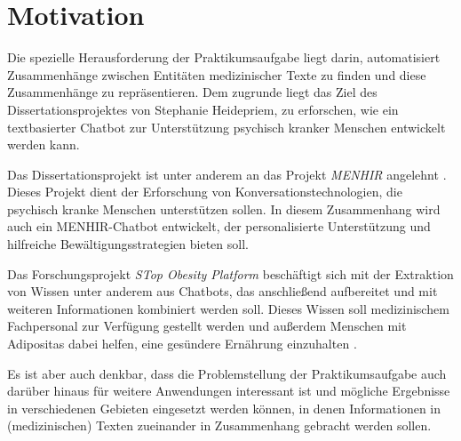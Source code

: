 \section{Motivation}

Die spezielle Herausforderung der Praktikumsaufgabe liegt darin, automatisiert Zusammenhänge zwischen Entitäten medizinischer Texte zu finden und diese Zusammenhänge zu repräsentieren. Dem zugrunde liegt das Ziel des Dissertationsprojektes von Stephanie Heidepriem, zu erforschen, wie ein textbasierter Chatbot zur Unterstützung 
psychisch kranker Menschen entwickelt werden kann. 

Das Dissertationsprojekt  ist unter anderem an das Projekt \emph{MENHIR} angelehnt \cite{noauthor_menhir_2022}. Dieses Projekt dient der Erforschung von Konversationstechnologien, die psychisch kranke Menschen unterstützen sollen. In diesem Zusammenhang wird auch 
ein MENHIR-Chatbot entwickelt, der personalisierte Unterstützung und hilfreiche Bewältigungsstrategien bieten soll. 

Das Forschungsprojekt \emph{STop Obesity Platform} beschäftigt sich mit der Extraktion von Wissen unter anderem aus Chatbots, das anschließend aufbereitet und mit weiteren Informationen kombiniert werden soll. Dieses Wissen soll medizinischem Fachpersonal zur Verfügung gestellt werden und außerdem Menschen mit Adipositas dabei helfen, eine gesündere Ernährung einzuhalten \cite{noauthor_stop_2022}.


Es ist aber auch denkbar, dass die Problemstellung der Praktikumsaufgabe auch darüber hinaus für weitere Anwendungen interessant ist und mögliche Ergebnisse in verschiedenen Gebieten eingesetzt werden können, in denen Informationen in (medizinischen) Texten zueinander in Zusammenhang gebracht werden sollen.
